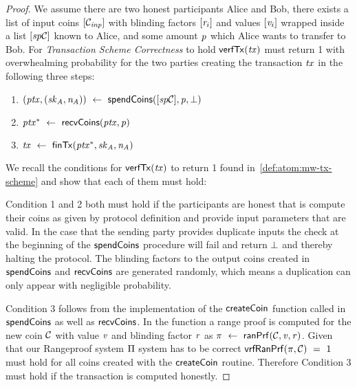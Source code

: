 \begin{proof}
    We assume there are two honest participants Alice and Bob, there exists a list of input coins $[\mathcal{C}_{\mathit{inp}}]$ with blinding factors $[\mathit{r}_i]$ and values $[\mathit{v}_i]$ wrapped inside a list $[\mathit{sp}\mathcal{C}]$ known to Alice, and some amount $\mathit{p}$ which Alice wants to transfer to Bob.
    For \emph{Transaction Scheme Correctness} to hold $\mathsf{verfTx}(\mathit{tx})$ must return 1 with overwhealming probability for the two parties creating the transaction $\mathit{tx}$ in the following three steps:
    \begin{enumerate}
        \item $(\mathit{ptx}, (\mathit{sk}_{\mathit{A}}, \mathit{\mathit{n}_{\mathit{A}}})) ~\leftarrow~ \mathsf{spendCoins}([\mathit{sp}\mathcal{C}],\mathit{p},\bot)$
        \item $\mathit{ptx}^* ~\leftarrow~ \mathsf{recvCoins}(\mathit{ptx},\mathit{p})$
        \item $\mathit{tx} ~\leftarrow~ \mathsf{finTx}(\mathit{ptx}^*,\mathit{sk}_{\mathit{A}},\mathit{\mathit{n}_{\mathit{A}}})$
    \end{enumerate}
    We recall the conditions for $\mathsf{verfTx}(\mathit{tx})$ to return 1 found in~\ref{def:atom:mw-tx-scheme} and show that each of them must hold:

    Condition 1 and 2 both must hold if the participants are honest that is compute their coins as given by protocol definition and provide input parameters that are valid.
    In the case that the sending party provides duplicate inputs the check at the beginning of the $\mathsf{spendCoins}$ procedure will fail and return $\bot$ and thereby halting the protocol.
    The blinding factors to the output coins created in $\mathsf{spendCoins}$ and $\mathsf{recvCoins}$ are generated randomly, which means a duplication can only appear with negligible probability.

    Condition 3 follows from the implementation of the $\mathsf{createCoin}$ function called in $\mathsf{spendCoins}$ as well as $\mathsf{recvCoins}$.
    In the function a range proof is computed for the new coin $\mathcal{C}$ with value $\mathit{v}$ and blinding factor $\mathit{r}$ as $\pi ~\leftarrow~ \mathsf{ranPrf}(\mathcal{C},\mathit{v},\mathit{r})$.
    Given that our Rangeproof system $\Pi$ system has to be correct $\mathsf{vrfRanPrf}(\pi,\mathcal{C}) ~=~ 1$ must hold for all coins created with the $\mathsf{createCoin}$ routine.
    Therefore Condition 3 must hold if the transaction is computed honestly.


\end{proof}
